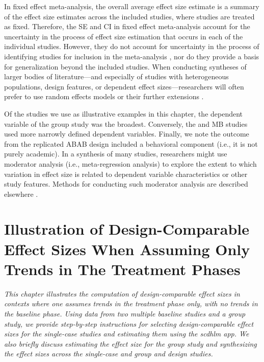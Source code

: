 \documentclass[
]{book}
\begin{document}
In fixed effect meta-analysis, the overall average effect size estimate is a summary of the effect size estimates across the included studies, where studies are treated as fixed. Therefore, the SE and CI in fixed effect meta-analysis account for the uncertainty in the process of effect size estimation that occurs in each of the individual studies. However, they do not account for uncertainty in the process of identifying studies for inclusion in the meta-analysis \citep{konstantopoulos2019statistically, Rice_Higgins_Lumley_2018}, nor do they provide a basis for generalization beyond the included studies. When conducting syntheses of larger bodies of literature---and especially of studies with heterogeneous populations, design features, or dependent effect sizes---researchers will often prefer to use random effects models \citep{Hedges_Vevea_1998} or their further extensions \citep{PustejovskyTipton2021, van2013three}.

Of the studies we use as illustrative examples in this chapter, the dependent variable of the group study \citep{hutchinson1993Effects} was the broadest. Conversely, the \citet{case1992Improving} and \citet{peltier2020Effects} MB studies used more narrowly defined dependent variables. Finally, we note the outcome from the replicated ABAB design \citep{lambert2006effects} included a behavioral component (i.e., it is not purely academic). In a synthesis of many studies, researchers might use moderator analysis (i.e., meta-regression analysis) to explore the extent to which variation in effect size is related to dependent variable characteristics or other study features. Methods for conducting such moderator analysis are described elsewhere \citetext{\citealp[Chapters 19-21]{borenstein2021introduction}; \citealp{konstantopoulos2019statistically}}.

\hypertarget{illustrate-D-CES-Ttrends}{%
\chapter{Illustration of Design-Comparable Effect Sizes When Assuming Only Trends in The Treatment Phases}\label{illustrate-D-CES-Ttrends}}

\emph{This chapter illustrates the computation of design-comparable effect sizes in contexts where one assumes trends in the treatment phase only, with no trends in the baseline phase. Using data from two multiple baseline studies and a group study, we provide step-by-step instructions for selecting design-comparable effect sizes for the single-case studies and estimating them using the \emph{scdhlm} app. We also briefly discuss estimating the effect size for the group study and synthesizing the effect sizes across the single-case and group and design studies.}
\end{document}

